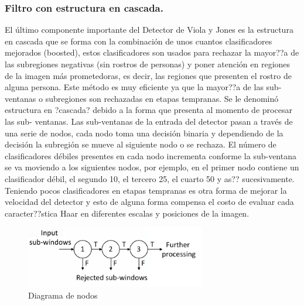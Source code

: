    \subsubsection{Filtro con estructura en cascada.}
   El último componente importante del Detector de Viola y Jones es la estructura en cascada que se forma con la combinación de unos cuantos clasificadores mejorados (boosted), estos clasificadores son usados para rechazar la mayor??a de las subregiones negativas (sin rostros de personas) y poner atención en regiones de la imagen más prometedoras, es decir, las regiones que presenten el rostro de alguna persona. Este método es muy eficiente ya que la mayor??a de las sub-ventanas o subregiones son rechazadas en etapas tempranas. Se le denominó estructura en ?cascada? debido a la forma que presenta al momento de procesar las sub- ventanas. Las sub-ventanas de la entrada del detector pasan a través de una serie de nodos, cada nodo toma una decisión binaria y dependiendo de la decisión la subregión se mueve al siguiente nodo o se rechaza. El número de clasificadores débiles presentes en cada nodo incrementa conforme la sub-ventana se va moviendo a los siguientes nodos, por ejemplo, en el primer nodo contiene un clasificador débil, el segundo 10, el tercero 25, el cuarto 50 y as?? sucesivamente. Teniendo pocos clasificadores en etapas tempranas es otra forma de mejorar la velocidad del detector y esto de alguna forma compensa el costo de evaluar cada caracter??stica Haar en diferentes escalas y posiciones de la imagen.
   \begin{figure}[htbp]
   	\centering
   	\includegraphics[width=0.7\textwidth]{./pictures/cascada}
   	\caption{Diagrama de nodos}\label{fig: figura}
   \end{figure}
   
